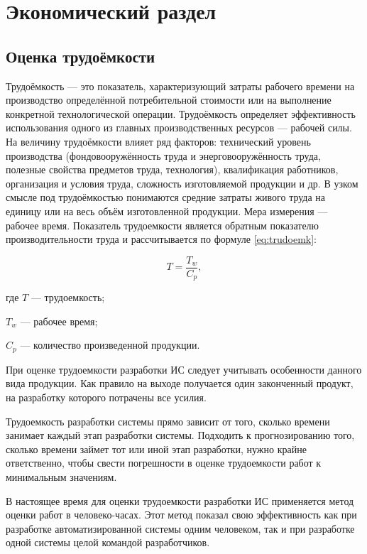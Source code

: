 \section{Экономический раздел}

\subsection{Оценка трудоёмкости}

Трудоёмкость --- это  показатель, характеризующий затраты рабочего времени на производство определённой потребительной стоимости или на выполнение конкретной технологической операции\cite{marks}.
Трудоёмкость определяет эффективность использования одного из главных производственных ресурсов — рабочей силы. На величину трудоёмкости влияет ряд факторов: технический уровень производства (фондовооружённость труда и энерговооружённость труда, полезные свойства предметов труда, технология), квалификация работников, организация и условия труда, сложность изготовляемой продукции и др.
В узком смысле под трудоёмкостью понимаются средние затраты живого труда на единицу или на весь объём изготовленной продукции. Мера измерения --- рабочее время.
Показатель трудоемкости является обратным показателю производительности труда и рассчитывается по формуле \ref{eq:trudoemk}:

\begin{equation}
	\label{eq:trudoemk}
	T = \frac{T_{w}}{C_{p}},
\end{equation}
\begin{ESKDexplanation}
	\item где $T$ --- трудоемкость;
	\item $T_{w}$ --- рабочее время;
	\item $C_{p}$ --- количество произведенной продукции.
\end{ESKDexplanation}

При оценке трудоемкости разработки ИС следует учитывать особенности данного вида продукции.
Как правило на выходе получается один законченный продукт, на разработку которого потрачены все усилия.

Трудоемкость разработки системы прямо зависит от того, сколько времени занимает каждый этап разработки системы. Подходить к прогнозированию того, сколько времени займет тот или иной этап разработки, нужно крайне ответственно, чтобы свести погрешности в оценке трудоемкости работ к минимальным значениям.

В настоящее время для оценки трудоемкости разработки ИС применяется метод оценки работ в человеко-часах. Этот метод показал свою эффективность как при разработке автоматизированной системы одним человеком, так и при разработке одной системы целой командой разработчиков.


